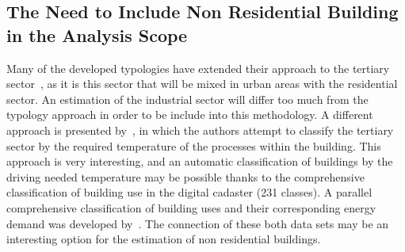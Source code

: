 \documentclass[authoryear,preprint,review,12pt]{elsarticle}
\begin{document}
\begin{linenumbers}


\subsection{The Need to Include Non Residential Building in the Analysis Scope}\label{sub-section:NR}

Many of the developed typologies have extended their approach to the tertiary
sector~\cite{Loga.2011, Hermelink.2011}, as it is this sector that will be
mixed in urban areas with the residential sector. An estimation of the
industrial sector will differ too much from the typology approach in order to be
include into this methodology. A different approach is presented
by~\cite{Blesl.2007}, in which the authors attempt to classify the tertiary
sector by the required temperature of the processes within the building.  This
approach is very interesting, and an automatic classification of buildings by
the driving needed temperature may be possible thanks to the comprehensive
classification of building use in the digital cadaster (231 classes).  A
parallel comprehensive classification of building uses and their corresponding
energy demand was developed by~\cite{Zeine.2007}.  The connection of these both
data sets may be an interesting option for the estimation of non residential
buildings.\\


\end{linenumbers}
\end{document}
